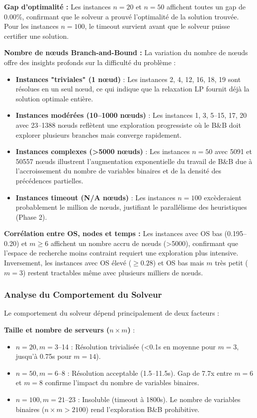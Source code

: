 \documentclass{article}
\begin{document}
\textbf{Gap d'optimalité :}
Les instances $n=20$ et $n=50$ affichent toutes un gap de 0.00\%, confirmant que le solveur a prouvé l'optimalité de la solution trouvée. Pour les instances $n=100$, le timeout survient avant que le solveur puisse certifier une solution.

\textbf{Nombre de nœuds Branch-and-Bound :}
La variation du nombre de nœuds offre des insights profonds sur la difficulté du problème :
\begin{itemize}
    \item \textbf{Instances "triviales" (1 nœud)} : Les instances 2, 4, 12, 16, 18, 19 sont résolues en un seul nœud, ce qui indique que la relaxation LP fournit déjà la solution optimale entière. 
    \item \textbf{Instances modérées (10--1000 nœuds)} : Les instances 1, 3, 5--15, 17, 20 avec 23--1388 nœuds reflètent une exploration progressiste où le B\&B doit explorer plusieurs branches mais converge rapidement.
    \item \textbf{Instances complexes (>5000 nœuds)} : Les instances $n=50$ avec 5091 et 50557 nœuds illustrent l'augmentation exponentielle du travail de B\&B due à l'accroissement du nombre de variables binaires et de la densité des précédences partielles.
    \item \textbf{Instances timeout (N/A nœuds)} : Les instances $n=100$ excèderaient probablement le million de nœuds, justifiant le parallélisme des heuristiques (Phase 2).
\end{itemize}

\textbf{Corrélation entre OS, nodes et temps :}
Les instances avec OS bas (0.195--0.20) et $m \ge 6$ affichent un nombre accru de nœuds (>5000), confirmant que l'espace de recherche moins contraint requiert une exploration plus intensive. Inversement, les instances avec OS élevé ($\ge 0.28$) et OS bas mais $m$ très petit ($m=3$) restent tractables même avec plusieurs milliers de nœuds.

\subsubsection{Analyse du Comportement du Solveur}

Le comportement du solveur dépend principalement de deux facteurs :

\textbf{Taille et nombre de serveurs ($n \times m$)} :
\begin{itemize}
    \item $n=20, m=3$--14 : Résolution trivialisée (<0.1s en moyenne pour $m=3$, jusqu'à 0.75s pour $m=14$).
    \item $n=50, m=6$--8 : Résolution acceptable (1.5--11.5s). Gap de 7.7x entre $m=6$ et $m=8$ confirme l'impact du nombre de variables binaires.
    \item $n=100, m=21$--23 : Insoluble (timeout à 1800s). Le nombre de variables binaires ($n \times m > 2100$) rend l'exploration B\&B prohibitive.
\end{itemize}
\end{document}
